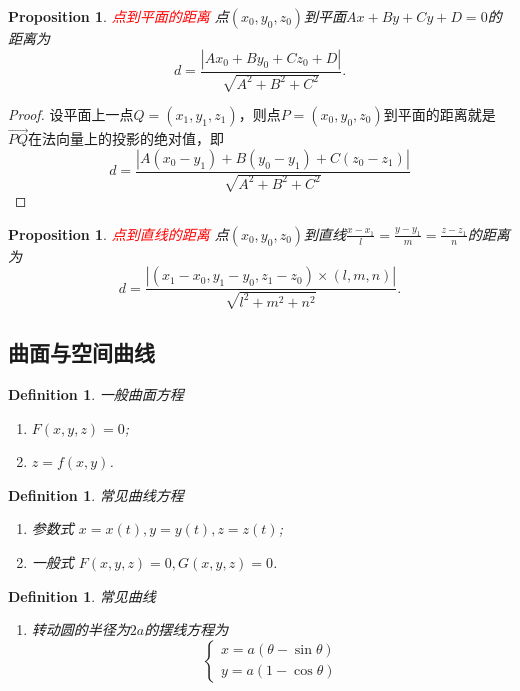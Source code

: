 \documentclass{article}
\newtheorem{proposition}[theorem]{Proposition}
\newtheorem{definition}[theorem]{Definition}
\newcommand{\redt}[1]{\textcolor{red}{#1}}
\begin{document}
\begin{proposition}
\rm \redt{点到平面的距离} 点$(x_0,y_0,z_0)$到平面$Ax + By + Cy + D =0$的距离为
$$
d = \frac{|Ax_0 + By_0 + Cz_0 + D|}{\sqrt{A^2 + B^2 + C^2}}.
$$
\end{proposition}

\begin{proof}
设平面上一点$Q=(x_1,y_1,z_1)$，则点$P=(x_0,y_0,z_0)$到平面的距离就是$\vec{PQ}$在法向量上的投影的绝对值，即
$$
d = \frac{|A(x_0-y_1) + B(y_0-y_1) + C(z_0-z_1)|}{\sqrt{A^2 + B^2 + C^2}}
$$
\end{proof}

\begin{proposition}
\rm \redt{点到直线的距离} 点$(x_0,y_0,z_0)$到直线$\frac{x-x_1}{l} = \frac{y-y_1}{m} = \frac{z-z_1}{n}$的距离为
$$
d = \frac{|(x_1-x_0,y_1-y_0,z_1-z_0) \times (l,m,n)|}{\sqrt{l^2+m^2+n^2}}.
$$
\end{proposition}


\subsection{曲面与空间曲线}

\begin{definition}
\rm 一般曲面方程
\begin{enumerate}
	\item $F(x,y,z) = 0$;
	\item $z = f(x,y)$.
\end{enumerate}
\end{definition}

\begin{definition}
\rm 常见曲线方程
\begin{enumerate}
	\item 参数式 $x = x(t),y = y(t),z = z(t)$;
	\item 一般式 $F(x,y,z) = 0, G(x,y,z) = 0$. 
\end{enumerate}
\end{definition}

\begin{definition}
\rm 常见曲线
\begin{enumerate}
	\item 转动圆的半径为$2a$的摆线方程为
	$$
		\left\{
		\begin{array}{ll}
		x = a(\theta-\sin\theta) \\
		y = a(1-\cos \theta)
		\end{array} \right.
	$$
\end{enumerate}
\end{definition}
\end{document}
